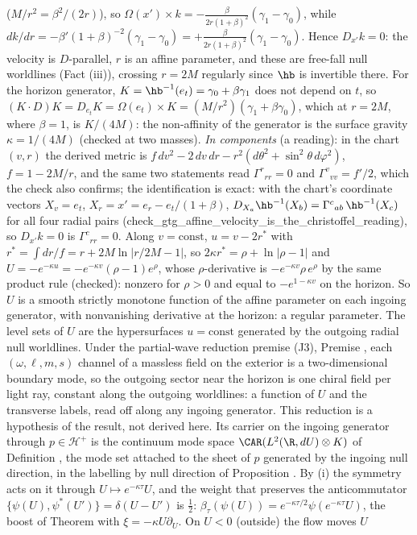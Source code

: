 ($M/r^{2} = \beta^{2}/(2r)$), so $\Omega(x') \times k = -\tfrac{\beta}{2r(1 + \beta)^{2}}(\gamma_{1} - \gamma_{0})$, while $dk/dr = -\beta'(1 + \beta)^{-2}(\gamma_{1} - \gamma_{0}) = +\tfrac{\beta}{2r(1 + \beta)^{2}}(\gamma_{1} - \gamma_{0})$. Hence $D_{x'}k = 0$: the velocity is $D$-parallel, $r$ is an affine parameter, and these are free-fall null worldlines (Fact (iii)), crossing $r = 2M$ regularly since $\hb$ is invertible there. For the horizon generator, $K = \hb^{-1}(e_{t}) = \gamma_{0} + \beta\gamma_{1}$ does not depend on $t$, so $(K \cdot D)K = D_{e_{t}}K = \Omega(e_{t}) \times K = (M/r^{2})(\gamma_{1} + \beta\gamma_{0})$, which at $r = 2M$, where $\beta = 1$, is $K/(4M)$: the non-affinity of the generator is the surface gravity $\kappa = 1/(4M)$ (checked at two masses). \emph{In components} (a reading): in the chart $(v, r)$ the derived metric is $f\,dv^{2} - 2\,dv\,dr - r^{2}(d\theta^{2} + \sin^{2}\theta\,d\varphi^{2})$, $f = 1 - 2M/r$, and the same two statements read $\Gamma^{r}{}_{rr} = 0$ and $\Gamma^{v}{}_{vv} = f'/2$, which the check also confirms; the identification is exact: with the chart's coordinate vectors $X_{v} = e_{t}$, $X_{r} = x' = e_{r} - e_{t}/(1 + \beta)$, $D_{X_{a}}\hb^{-1}(X_{b}) = \Gamma^{c}{}_{ab}\,\hb^{-1}(X_{c})$ for all four radial pairs (check\_gtg\_affine\_velocity\_is\_the\_christoffel\_reading), so $D_{x'}k = 0$ is $\Gamma^{c}{}_{rr} = 0$. Along $v = \mathrm{const}$, $u = v - 2r^{*}$ with $r^{*} = \int dr/f = r + 2M\ln|r/2M - 1|$, so $2\kappa r^{*} = \rho + \ln|\rho - 1|$ and $U = -e^{-\kappa u} = -e^{-\kappa v}(\rho - 1)e^{\rho}$, whose $\rho$-derivative is $-e^{-\kappa v}\rho\,e^{\rho}$ by the same product rule (checked): nonzero for $\rho > 0$ and equal to $-e^{1 - \kappa v}$ on the horizon. So $U$ is a smooth strictly monotone function of the affine parameter on each ingoing generator, with nonvanishing derivative at the horizon: a regular parameter. The level sets of $U$ are the hypersurfaces $u = \mathrm{const}$ generated by the outgoing radial null worldlines. Under the partial-wave reduction premise (J3), Premise , each $(\omega, \ell, m, s)$ channel of a massless field on the exterior is a two-dimensional boundary mode, so the outgoing sector near the horizon is one chiral field per light ray, constant along the outgoing worldlines: a function of $U$ and the transverse labels, read off along any ingoing generator. This reduction is a hypothesis of the result, not derived here. Its carrier on the ingoing generator through $p \in \mathcal{H}^{+}$ is the continuum mode space $\CAR(L^{2}(\R, dU)\otimes K)$ of Definition , the mode set attached to the sheet of $p$ generated by the ingoing null direction, in the labelling by null direction of Proposition . By (i) the symmetry acts on it through $U \mapsto e^{-\kappa\tau}U$, and the weight that preserves the anticommutator $\{\psi(U), \psi^{*}(U')\} = \delta(U - U')$ is $\tfrac12$: $\beta_{\tau}(\psi(U)) = e^{-\kappa\tau/2}\psi(e^{-\kappa\tau}U)$, the boost of Theorem  with $\xi = -\kappa U\partial_{U}$. On $U < 0$ (outside) the flow moves $U$ 